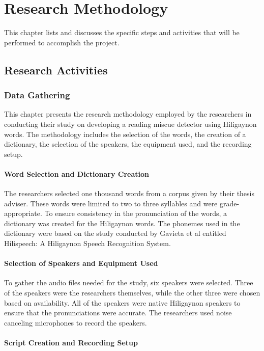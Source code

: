 \chapter{Research Methodology}
This chapter lists and discusses the specific steps and activities that will be performed to accomplish the project.

\section{Research Activities}

\subsection{Data Gathering}
This chapter presents the research methodology employed by the researchers in conducting their study on developing a reading miscue detector using Hiligaynon words. The methodology includes the selection of the words, the creation of a dictionary, the selection of the speakers, the equipment used, and the recording setup.

\subsubsection{Word Selection and Dictionary Creation}

The researchers selected one thousand words from a corpus given by their thesis adviser. These words were limited to two to three syllables and were grade-appropriate. To ensure consistency in the pronunciation of the words, a dictionary was created for the Hiligaynon words. The phonemes used in the dictionary were based on the study conducted by Gavieta et al entitled Hilispeech: A Hiligaynon Speech Recognition System.

\subsubsection{Selection of Speakers and Equipment Used}

To gather the audio files needed for the study, six speakers were selected. Three of the speakers were the researchers themselves, while the other three were chosen based on availability. All of the speakers were native Hiligaynon speakers to ensure that the pronunciations were accurate. The researchers used noise canceling microphones to record the speakers.

\subsubsection{Script Creation and Recording Setup}

